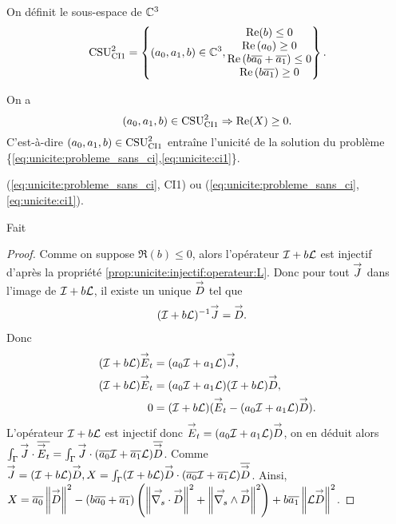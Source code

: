     \begin{defn}
      \label{def:csu:ci1-2}

      On définit le sous-espace de \(\CC^3\)
      \begin{equation*}
        \CSU[2]{CI1} = \left\lbrace
        (a_0,a_1,b) \in \CC^3,
        \begin{matrix}
        \Re(b) \le 0
        \\
        \Re\left(a_0\right) \ge 0
        \\
        \Re\left(b\conj{a_0}+\conj{a_1}\right) \le 0
        \\
        \Re\left(b\conj{a_1}\right) \ge 0
        \end{matrix}
        \right\rbrace.
      \end{equation*}
    \end{defn}

    \begin{prop}
      \label{prop:csu:ci1-2}
      On a 
      \begin{equation*}
        (a_0,a_1,b) \in \CSU[2]{CI1} \Rightarrow \Re(X)\ge 0. 
      \end{equation*}
      C'est-à-dire \((a_0,a_1,b) \in \CSU[2]{CI1}\) entraîne l'unicité de la solution du problème \{\eqref{eq:unicite:probleme_sans_ci},\eqref{eq:unicite:ci1}\}.
      \begin{REM}
        (\eqref{eq:unicite:probleme_sans_ci}, CI1) ou (\eqref{eq:unicite:probleme_sans_ci},\eqref{eq:unicite:ci1}).
      \end{REM}
      \begin{REP}
        Fait
      \end{REP}
    \end{prop}

    \begin{proof}
      Comme on suppose \(\Re(b)\le 0\), alors l'opérateur \(\oI + b\LL\) est injectif d'après la propriété \ref{prop:unicite:injectif:operateur:L}. Donc pour tout \(\vJ\) dans l'image de \(\oI + b\LL\), il existe un unique \(\vect{D}\) tel que
      \begin{align*}
        (\oI + b \LL)^{-1}\vJ &= \vect{D}.
      \end{align*}
      Donc 
      \begin{align*}
        (\oI + b \LL)\vE_t &= (a_0\oI + a_1\LL)\vJ,
        \\
        (\oI + b \LL)\vE_t &= (a_0\oI + a_1\LL)(\oI + b \LL)\vect{D},
        \\
        0 &= (\oI + b \LL)(\vE_t -  (a_0\oI + a_1\LL)\vect{D}).
      \end{align*}
      L'opérateur \(\oI + b \LL\) est injectif donc \(\vE_t = (a_0\oI + a_1\LL)\vect{D}\), on en déduit alors \(\int_\Gamma \vJ \cdot \conj{\vE_t} = \int_\Gamma \vJ \cdot (\conj{a_0}\oI + \conj{a_1}\LL)\conj{\vect{D}}\).
      Comme \(\vJ = (\oI + b \LL)\vect{D}, X = \int_\Gamma (\oI + b \LL)\vect{D} \cdot (\conj{a_0}\oI + \conj{a_1}\LL)\conj{\vect{D}}\).
      Ainsi, \( X = \conj{a_0}\norm{\vect{D}}^2 - (b\conj{a_0}+\conj{a_1})\left(\norm{\vdivs{\vect{D}}}^2+\norm{\vrots{\vect{D}}}^2\right) + b\conj{a_1} \norm{\LL\vect{D}}^2\).
    \end{proof}

